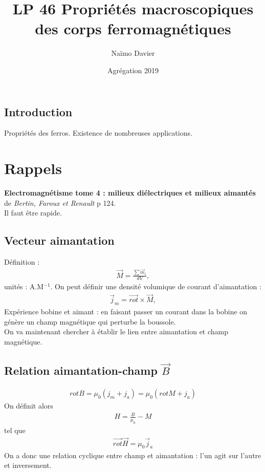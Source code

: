 \documentclass[12pt,prb,aps,epsf]{article}
\begin{document}
	
	\title{LP 46 Propriétés macroscopiques des corps ferromagnétiques}
	\author{Naïmo Davier}
	\date{Agrégation 2019}
	
	\maketitle
	
	\tableofcontents
	
	\pagebreak
		
\subsection{Introduction}
Propriétés des ferros. Existence de nombreuses applications.

\section{Rappels}
\textbf{Electromagnétisme tome 4 : milieux diélectriques et milieux aimantés} de \textit{Bertin, Faroux et Renault} p 124.\\

Il faut être rapide.
\subsection{Vecteur aimantation}
Définition :
\begin{eqnarray}
\vec{M} = \frac{\sum\vec{m}_i}{dV},
\end{eqnarray}
unités : A.M$^{-1}$. On peut définir une densité volumique de courant d'aimantation : 
\begin{eqnarray}
\vec{j}_m = \vec{rot}\times \vec{M},
\end{eqnarray} 
Expérience bobine et aimant : en faisant passer un courant dans la bobine on génère un champ magnétique qui perturbe la boussole.\\
On va maintenant chercher à établir le lien entre aimantation et champ magnétique.

\subsection{Relation aimantation-champ $\vec{B}$}
\begin{eqnarray}
rotB = \mu_0(j_m+j_a) = \mu_0(rotM+j_a)
\end{eqnarray}
On définit alors 
\begin{eqnarray}
H = \frac{B}{\mu_0}-M
\end{eqnarray}
tel que 
\begin{eqnarray}
\vec{rot}\vec{H} = \mu_0\vec{j}_a
\end{eqnarray}
 On a donc une relation cyclique entre champ et aimantation : l'un agit sur l'autre et inversement.
 
\end{document}
